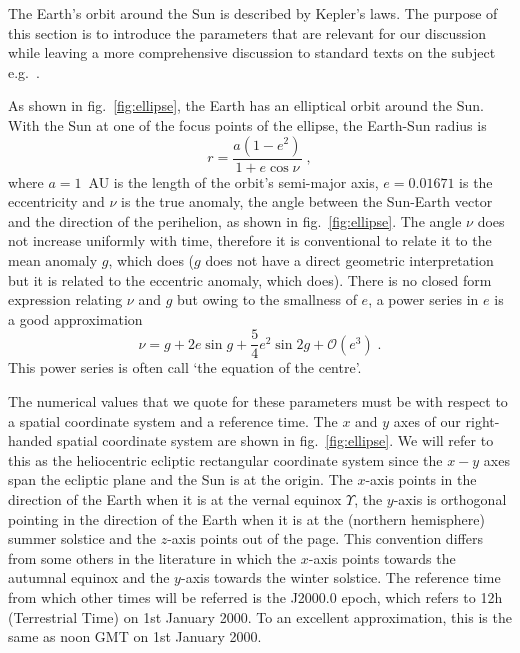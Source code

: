 \documentclass[preprintnumbers,a4paper,twocolumn,floats,nofootinbib,superscriptaddress,aps,prd]{revtex4-1}
\begin{document}
The Earth's orbit around the Sun is described by Kepler's laws. The purpose of this section is to introduce the parameters that are relevant for our discussion while leaving a more comprehensive discussion to standard texts on the subject e.g.~\cite{Murray1999}.

As shown in fig.~\ref{fig:ellipse}, the Earth has an elliptical orbit around the Sun. With the Sun at one of the focus points of the ellipse, the Earth-Sun radius is
\begin{equation}
r=\frac{a (1-e^2)}{1+e \cos\nu}\;,
\end{equation}
where $a=1$~AU is the length of the orbit's semi-major axis, $e=0.01671$ is the eccentricity and $\nu$ is the true anomaly, the angle between the Sun-Earth vector and the direction of the perihelion, as shown in fig.~\ref{fig:ellipse}. The angle $\nu$ does not increase uniformly with time, therefore it is conventional to relate it to the mean anomaly $g$, which does ($g$ does not have a direct geometric interpretation but it is related to the eccentric anomaly, which does). There is no closed form expression relating $\nu$ and $g$ but owing to the smallness of $e$, a power series in $e$ is a good approximation~\cite{Murray1999}
\begin{equation}
\label{eq:centre}
\nu=g+2e \sin g+\frac{5}{4}e^2 \sin 2g+\mathcal{O}(e^3)\;.
\end{equation}
This power series is often call `the equation of the centre'.

The numerical values that we quote for these parameters must be with respect to a spatial coordinate system and a reference time. The $x$ and $y$ axes of our right-handed spatial coordinate system are shown in fig.~\ref{fig:ellipse}. We will refer to this as the  heliocentric ecliptic rectangular coordinate system since the $x-y$ axes span the ecliptic plane and the Sun is at the origin. The $x$-axis points in the direction of the Earth when it is at the vernal equinox $\Upsilon$, the $y$-axis is orthogonal pointing in the direction of the Earth when it is at the (northern hemisphere) summer solstice and the $z$-axis points out of the page. This convention differs from some others in the literature in which the $x$-axis points towards the autumnal equinox and the $y$-axis towards the winter solstice. The reference time from which other times will be referred is the J2000.0 epoch, which refers to 12h (Terrestrial Time) on 1st January 2000. To an excellent approximation, this is the same as noon GMT on 1st January 2000.
\end{document}

